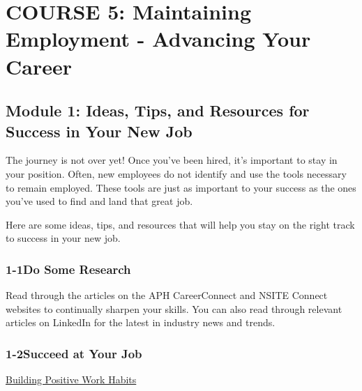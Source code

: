 \hypertarget{course5}{}\chapter*{COURSE 5: Maintaining Employment - Advancing Your Career}\label{course5}
\noindent\makebox[\linewidth]{\rule{\linewidth}{0.4pt}}
\localtableofcontents 
\noindent\makebox[\textwidth]{\rule{\linewidth}{0.4pt}} 
\newpage
\pagebreak \section*{Module 1:	Ideas, Tips, and Resources for Success in Your New Job}
\noindent\makebox[\textwidth]{\rule{\linewidth}{0.4pt}} 
\localtableofcontents 
\noindent\makebox[\textwidth]{\rule{\linewidth}{0.4pt}} 


The journey is not over yet! Once you've been hired, it's important to stay in your position. Often, new employees do not identify and use the tools necessary to remain employed. These tools are just as important to your success as the ones you've used to find and land that great job.

Here are some ideas, tips, and resources that will help you stay on the right track to success in your new job.
\pagebreak \subsection*{1-1\quad Do Some Research}
Read through the articles on the APH CareerConnect and NSITE Connect websites to continually sharpen your skills. You can also read through relevant articles on LinkedIn for the latest in industry news and trends.

\pagebreak \subsection*{1-2\quad Succeed at Your Job}

\href{https://aphcareerconnect.org/succeed-at-work/succeeding-at-your-job/solving-problems-at-work/}{Building Positive Work Habits}

